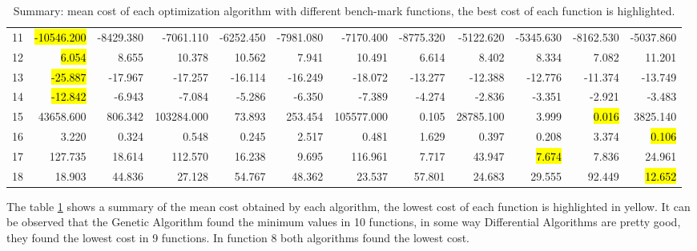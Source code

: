 \documentclass[12pt]{article}
\begin{document}
\begin{landscape}
\begin{table}[H]
\begin{tabular}{rrrrrrrrrrrr}
    11 & \hl{-10546.200} &      -8429.380 &      -7061.110 &          -6252.450 &      -7981.080 &      -7170.400 &      -8775.320 &      -5122.620 &          -5345.630 &      -8162.530 &      -5037.860 \\
    12 &      \hl{6.054} &          8.655 &         10.378 &             10.562 &          7.941 &         10.491 &          6.614 &          8.402 &              8.334 &          7.082 &         11.201 \\
    13 &    \hl{-25.887} &        -17.967 &        -17.257 &            -16.114 &        -16.249 &        -18.072 &        -13.277 &        -12.388 &            -12.776 &        -11.374 &        -13.749 \\
    14 &    \hl{-12.842} &         -6.943 &         -7.084 &             -5.286 &         -6.350 &         -7.389 &         -4.274 &         -2.836 &             -3.351 &         -2.921 &         -3.483 \\
    15 &  43658.600 &        806.342 &     103284.000 &             73.893 &        253.454 &     105577.000 &          0.105 &      28785.100 &              3.999 &          \hl{0.016} &       3825.140 \\
    16 &      3.220 &          0.324 &          0.548 &              0.245 &          2.517 &          0.481 &          1.629 &          0.397 &              0.208 &          3.374 &          \hl{0.106} \\
    17 &    127.735 &         18.614 &        112.570 &             16.238 &          9.695 &        116.961 &          7.717 &         43.947 &              \hl{7.674} &          7.836 &         24.961 \\
    18 &     18.903 &         44.836 &         27.128 &             54.767 &         48.362 &         23.537 &         57.801 &         24.683 &             29.555 &         92.449 &         \hl{12.652} \\
    \bottomrule
\end{tabular}
\caption{Summary: mean cost of each optimization algorithm with different bench-mark functions, the best cost of each function is highlighted.} 
    \label{tab:summary}
\end{table}

The table \ref{tab:summary} shows a summary of the mean cost obtained by each algorithm, the lowest cost of each function is highlighted in yellow. It can be observed that the Genetic Algorithm found the minimum values in 10 functions, in some way Differential Algorithms are pretty good, they found the lowest cost in 9 functions. In function 8 both algorithms found the lowest cost. 
\end{landscape}
\end{document}
